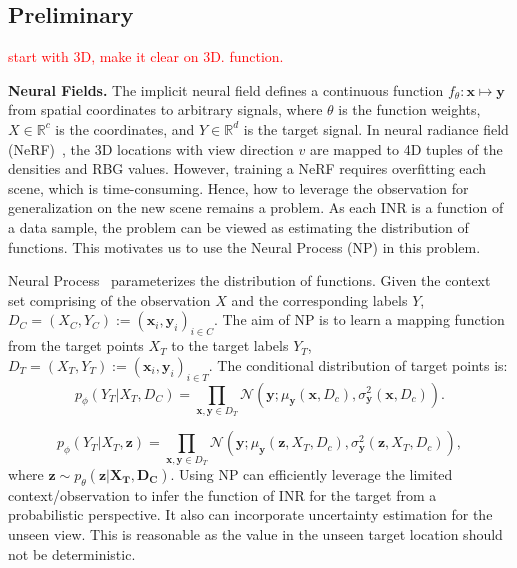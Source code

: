 
\subsection{Preliminary}

\textcolor{red}{start with 3D, make it clear on 3D. function. }

\noindent 
\textbf{Neural Fields.}
The implicit neural field defines a continuous function $f_\theta : \mathbf{x} \mapsto \mathbf{y}$ from spatial coordinates to arbitrary signals, where $\theta$ is the function weights, $X\in \mathbb{R}^c$ is the coordinates, and $Y\in \mathbb{R}^d$ is the target signal. In neural radiance field (NeRF)~\cite{mildenhall2021nerf}, the 3D locations with view direction $v$ are mapped to 4D tuples of the densities and RBG values. However, training a NeRF requires overfitting each scene, which is time-consuming. Hence, how to leverage the observation for generalization on the new scene remains a problem. As each INR is a function of a data sample, the problem can be viewed as estimating the distribution of functions. This motivates us to use the Neural Process (NP) in this problem. 
 



 Neural Process~\cite{garnelo2018neural} parameterizes the distribution of functions. Given the context set comprising of the observation $X$ and the corresponding labels $Y$, $D_C = (X_C, Y_C) := (\mathbf{x}_i, \mathbf{y}_{i})_{i\in C} $. The aim of NP is to learn a mapping function from the target points $X_T$ to the target labels $Y_T$,  $D_T = (X_T, Y_T) := (\mathbf{x}_i, \mathbf{y}_{i})_{i\in T} $. The conditional distribution of target points is:
\begin{equation}
    p_{\phi}(Y_T|X_T,D_C) = \prod_{\mathbf{x}, \mathbf{y}\in D_{T}} \mathcal{N}(\mathbf{y};\mu_{\mathbf{y}}(\mathbf{x},D_c), \sigma^2_{\mathbf{y}}(\mathbf{x},D_c)).
\end{equation}

\begin{equation}
    p_{\phi}(Y_T|X_T, \mathbf{z}) = \prod_{\mathbf{x}, \mathbf{y}\in D_{T}} \mathcal{N}(\mathbf{y};\mu_{\mathbf{y}}(\mathbf{z}, X_T,D_c), \sigma^2_{\mathbf{y}}(\mathbf{z}, X_T,D_c)),
\end{equation}
where $\mathbf{z} \sim p_{\theta}(\mathbf{z|X_T,D_C})$. Using NP can efficiently leverage the limited context/observation to infer the function of INR for the target from a probabilistic perspective. It also can incorporate uncertainty estimation for the unseen view. This is reasonable as the value in the unseen target location should not be deterministic. 

